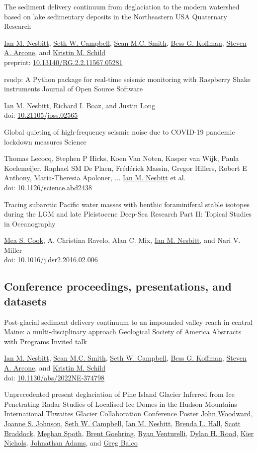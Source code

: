 \documentclass[a4paper,12pt,sans,colorlinks]{moderncv}
\newcommand{\me}{\href{https://www.iannesbitt.org}{Ian M. Nesbitt}}
\newcommand{\seth}{\href{https://www.alpinesciences.net}{Seth W. Campbell}}
\newcommand{\sean}{\href{https://umaine.edu/earthclimate/people/sean-m-c-smith/}{Sean M.C. Smith}}
\newcommand{\bess}{\href{https://www.colby.edu/directory/profile/bess.koffman/}{Bess G. Koffman}}
\newcommand{\stevearcone}{\href{https://engineering.dartmouth.edu/community/faculty/steven-arcone}{Steven A. Arcone}}
\newcommand{\kristin}{\href{https://climatechange.umaine.edu/people/kristin-schild/}{Kristin M. Schild}}
\newcommand{\richard}{Richard I. Boaz}
\newcommand{\mea}{\href{https://geosciences.williams.edu/profile/msc1/}{Mea S. Cook}}
\newcommand{\johnwoodward}{\href{https://www.northumbria.ac.uk/about-us/our-staff/w/john-woodward}{John Woodward}}
\newcommand{\joannejohnson}{\href{https://www.bas.ac.uk/profile/jsj/}{Joanne S. Johnson}}
\newcommand{\brenda}{\href{https://climatechange.umaine.edu/people/brenda-hall/}{Brenda L. Hall}}
\newcommand{\scott}{\href{https://climatechange.umaine.edu/people/scott-braddock/}{Scott Braddock}}
\newcommand{\meghan}{\href{https://climatechange.umaine.edu/people/meghan-spoth/}{Meghan Spoth}}
\newcommand{\brent}{\href{https://sse.tulane.edu/eens/faculty/goehring}{Brent Goehring}}
\newcommand{\ryanventurelli}{\href{https://sse.tulane.edu/eens/faculty/venturelli}{Ryan Venturelli}}
\newcommand{\dylanrood}{\href{http://www.imperial.ac.uk/people/d.rood}{Dylan H. Rood}}
\newcommand{\kiernichols}{\href{https://www.researchgate.net/profile/Keir-Nichols}{Kier Nichols}}
\newcommand{\johnathanadams}{\href{https://thwaitesglacier.org/people/jonathan-adams}{Johnathan Adams}}
\newcommand{\gregbalco}{\href{https://www.bgc.org/greg-balco}{Greg Balco}}
\newcommand{\doi}[1]{%
    \href{https://doi.org/#1}{#1}
}
\begin{document}
{The sediment delivery continuum from deglaciation to the modern
watershed based on lake sedimentary deposits in the Northeastern
USA}
{Quaternary Research}
{}
{}
{
    \me{}, \seth{}, \sean{}, \bess{}, \stevearcone{},
    and \kristin{}
    \\
    preprint: \doi{10.13140/RG.2.2.11567.05281}
}

{rsudp: A Python package for real-time seismic
monitoring with Raspberry Shake instruments}
{Journal of Open Source Software}
{}
{}
{
    \me{}, \richard, and Justin Long
    \\
    doi: \doi{10.21105/joss.02565}
}

{Global quieting of high-frequency seismic noise
due to COVID-19 pandemic lockdown measures}
{Science}
{}
{}
{
    Thomas Lecocq, Stephen P Hicks, Koen Van Noten,
    Kasper van Wijk, Paula Koelemeijer, Raphael SM De Plaen,
    Frédérick Massin, Gregor Hillers, Robert E Anthony,
    Maria-Theresia Apoloner, ... \me{} et al.
    \\
    doi: \doi{10.1126/science.abd2438}
}

{Tracing subarctic Pacific water masses with benthic
foraminiferal stable isotopes during the LGM and late
Pleistocene}
{Deep-Sea Research Part II: Topical Studies in Oceanography}
{}
{}
{
    \mea{}, A. Christina Ravelo, Alan C. Mix, \me{},
    and Nari V. Miller
    \\
    doi: \doi{10.1016/j.dsr2.2016.02.006}
}


\newpage
\subsection{Conference proceedings, presentations, and datasets}

{Post-glacial sediment delivery continuum to an impounded
valley reach in central Maine: a multi-disciplinary approach}
{Geological Society of America Abstracts with Programs}
{}
{Invited talk}
{
    \me{}, \sean{}, \seth{}, \bess{}, \stevearcone{}, and \kristin{}
    \\
    doi: \doi{10.1130/abs/2022NE-374798}
}

{Unprecedented present deglaciation of Pine Island Glacier
Inferred from Ice Penetrating Radar Studies of Localised
Ice Domes in the Hudson Mountains}
{International Thwaites Glacier Collaboration Conference}
{}
{Poster}
{
    \johnwoodward{}, \joannejohnson{}, \seth{}, \me{}, \brenda{}, \scott{},
    \meghan{}, \brent{}, \ryanventurelli{}, \dylanrood{}, \kiernichols{},
    \johnathanadams{}, and \gregbalco{}
}
\end{document}
